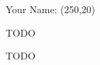 \documentclass[solution, letterpaper]{cs20exam}
\newcommand{\namebox}{\framebox(250,20){}}
\begin{document}

\vspace{-1.8in}\hbox{}\hspace{2in}Your Name: \namebox
\vspace{1.2in}

\problem{}{} TODO

\begin{solution}
TODO
\end{solution}

\pagebreak
\end{document}
